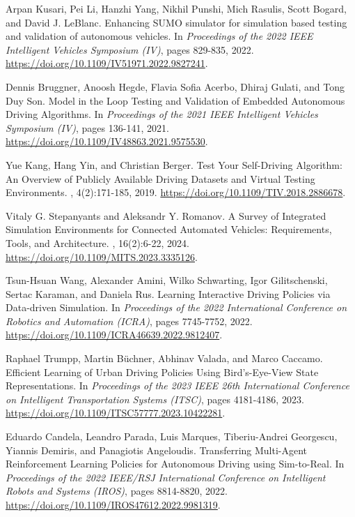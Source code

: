 \documentclass[lettersize,journal]{IEEEtran}
\begin{document}
\begin{thebibliography}{1}
Arpan Kusari, Pei Li, Hanzhi Yang, Nikhil Punshi, Mich Rasulis, Scott Bogard, and David J. LeBlanc.
\newblock Enhancing SUMO simulator for simulation based testing and validation of autonomous vehicles.
\newblock In {\em Proceedings of the 2022 IEEE Intelligent Vehicles Symposium (IV)}, pages 829-835, 2022.
\newblock \url{https://doi.org/10.1109/IV51971.2022.9827241}.

Dennis Bruggner, Anoosh Hegde, Flavia Sofia Acerbo, Dhiraj Gulati, and Tong Duy Son.
\newblock Model in the Loop Testing and Validation of Embedded Autonomous Driving Algorithms.
\newblock In {\em Proceedings of the 2021 IEEE Intelligent Vehicles Symposium (IV)}, pages 136-141, 2021.
\newblock \url{https://doi.org/10.1109/IV48863.2021.9575530}.

Yue Kang, Hang Yin, and Christian Berger.
\newblock Test Your Self-Driving Algorithm: An Overview of Publicly Available Driving Datasets and Virtual Testing Environments.
, 4(2):171-185, 2019.
\newblock \url{https://doi.org/10.1109/TIV.2018.2886678}.

Vitaly G. Stepanyants and Aleksandr Y. Romanov.
\newblock A Survey of Integrated Simulation Environments for Connected Automated Vehicles: Requirements, Tools, and Architecture.
, 16(2):6-22, 2024.
\newblock \url{https://doi.org/10.1109/MITS.2023.3335126}.

Tsun-Hsuan Wang, Alexander Amini, Wilko Schwarting, Igor Gilitschenski, Sertac Karaman, and Daniela Rus.
\newblock Learning Interactive Driving Policies via Data-driven Simulation.
\newblock In {\em Proceedings of the 2022 International Conference on Robotics and Automation (ICRA)}, pages 7745-7752, 2022.
\newblock \url{https://doi.org/10.1109/ICRA46639.2022.9812407}.

Raphael Trumpp, Martin Büchner, Abhinav Valada, and Marco Caccamo.
\newblock Efficient Learning of Urban Driving Policies Using Bird's-Eye-View State Representations.
\newblock In {\em Proceedings of the 2023 IEEE 26th International Conference on Intelligent Transportation Systems (ITSC)}, pages 4181-4186, 2023.
\newblock \url{https://doi.org/10.1109/ITSC57777.2023.10422281}.

Eduardo Candela, Leandro Parada, Luis Marques, Tiberiu-Andrei Georgescu, Yiannis Demiris, and Panagiotis Angeloudis.
\newblock Transferring Multi-Agent Reinforcement Learning Policies for Autonomous Driving using Sim-to-Real.
\newblock In {\em Proceedings of the 2022 IEEE/RSJ International Conference on Intelligent Robots and Systems (IROS)}, pages 8814-8820, 2022.
\newblock \url{https://doi.org/10.1109/IROS47612.2022.9981319}.


\end{thebibliography}
\end{document}
